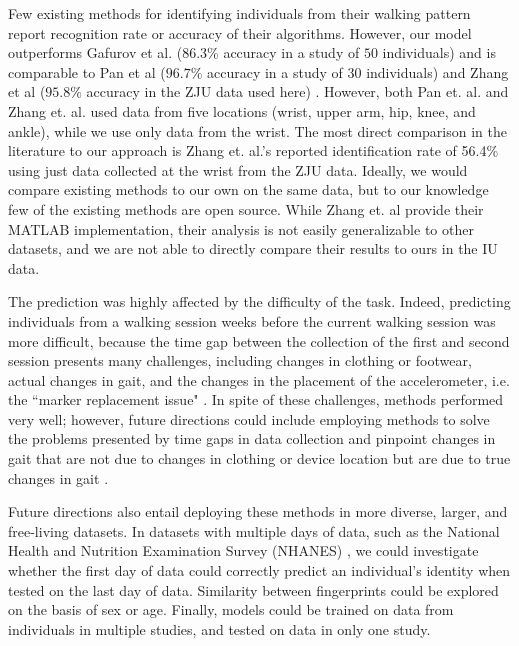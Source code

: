 Few existing methods for identifying individuals from their walking pattern report recognition rate or accuracy of their algorithms. However, our model outperforms Gafurov et al. ($86.3$\% accuracy in a study of $50$ individuals)  \cite{gafurov2007gait} and is comparable to Pan et al ($96.7$\% accuracy in a study of $30$ individuals)\cite{pan_accelerometer-based_2009} and Zhang et al ($95.8$\% accuracy in the ZJU data used here) \cite{zhang_accelerometer-based_2015}. However, both Pan et. al. and Zhang et. al. used data from five locations (wrist, upper arm, hip, knee, and ankle), while we use only data from the wrist. The most direct comparison in the literature to our approach is Zhang et. al.'s reported identification rate of 56.4\% using just data collected at the wrist from the ZJU data. Ideally, we would compare existing methods to our own on the same data, but to our knowledge few of the existing methods are open source. While Zhang et. al provide their MATLAB implementation, their analysis is not easily generalizable to other datasets, and we are not able to directly compare their results to ours in the IU data.


The prediction was highly affected by the difficulty of the task. Indeed, predicting individuals from a walking session weeks before the current walking session was more difficult, because the time gap between the collection of the first and second session presents many challenges, including changes in clothing or footwear, actual changes in gait, and the changes in the placement of the accelerometer, i.e. the ``marker replacement issue" \cite{Telschow2020}. In spite of these challenges, methods performed very well; however, future directions could include employing methods to solve the problems presented by time gaps in data collection and pinpoint changes in gait that are not due to changes in clothing or device location but are due to true changes in gait \cite{Telschow2023}.

Future directions also entail deploying these methods in more diverse, larger, and free-living datasets. In datasets with multiple days of data, such as the National Health and Nutrition Examination Survey (NHANES) \cite{nhanes}, we could investigate whether the first day of data could correctly predict an individual's identity when tested on the last day of data. Similarity between fingerprints could be explored on the basis of sex or age. Finally, models could be trained on data from individuals in multiple studies, and tested on data in only one study.

